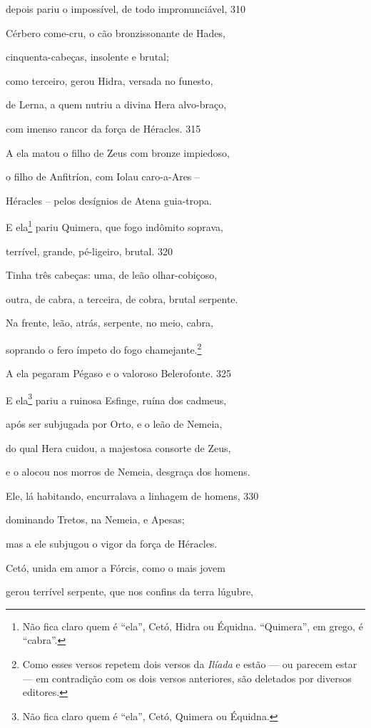 depois pariu o impossível, de todo impronunciável, \num{310}

Cérbero come-cru, o cão bronzissonante de Hades,

cinquenta-cabeças, insolente e brutal;

como terceiro, gerou Hidra, versada no funesto,

de Lerna, a quem nutriu a divina Hera alvo-braço,

com imenso rancor da força de Héracles. \num{315}

A ela matou o filho de Zeus com bronze impiedoso,

o filho de Anfitríon, com Iolau caro-a-Ares --

Héracles -- pelos desígnios de Atena guia-tropa.

E ela\footnote{Não fica claro quem é ``ela'', Cetó, Hidra ou Équidna. ``Quimera'',
em grego, é ``cabra''.} pariu Quimera, que fogo indômito soprava,

terrível, grande, pé-ligeiro, brutal. \num{320}

Tinha três cabeças: uma, de leão olhar-cobiçoso,

outra, de cabra, a terceira, de cobra, brutal serpente.

Na frente, leão, atrás, serpente, no meio, cabra,

soprando o fero ímpeto do fogo chamejante.\footnote{Como esses versos repetem dois versos da \emph{Ilíada} e estão
--- ou parecem estar --- em contradição com os dois versos anteriores, são
deletados por diversos editores.}

A ela pegaram Pégaso e o valoroso Belerofonte. \num{325}

E ela\footnote{Não fica claro quem é ``ela'', Cetó, Quimera ou Équidna.} pariu a ruinosa Esfinge, ruína dos cadmeus,

após ser subjugada por Orto, e o leão de Nemeia,

do qual Hera cuidou, a majestosa consorte de Zeus,

e o alocou nos morros de Nemeia, desgraça dos homens.

Ele, lá habitando, encurralava a linhagem de homens, \num{330}

dominando Tretos, na Nemeia, e Apesas;

mas a ele subjugou o vigor da força de Héracles.

\quad{}Cetó, unida em amor a Fórcis, como o mais jovem

gerou terrível serpente, que nos confins da terra lúgubre,

